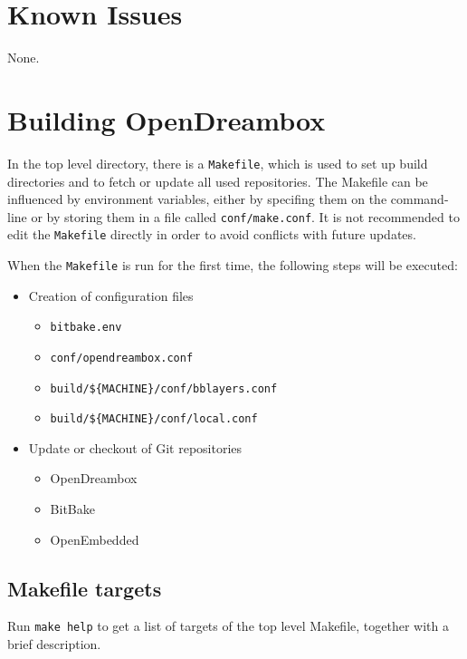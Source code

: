 \documentclass[a4paper]{article}
\newcommand{\shell}[1]{\texttt{\small #1}}
\begin{document}
\section{Known Issues}

  None.

\pagebreak

\section{Building OpenDreambox}

  In the top level directory, there is a \shell{Makefile}, which is used to
  set up build directories and to fetch or update all used repositories.
  The Makefile can be influenced by environment variables, either
  by specifing them on the command-line or by storing them in a file called
  \shell{conf/make.conf}. It is not recommended to edit the \shell{Makefile} directly
  in order to avoid conflicts with future updates.

  When the \shell{Makefile} is run for the first time, the following steps will
  be executed:

  \begin{itemize}
    \item Creation of configuration files
      \begin{itemize}
        \item \shell{bitbake.env}
        \item \shell{conf/opendreambox.conf}
        \item \shell{build/\$\{MACHINE\}/conf/bblayers.conf}
        \item \shell{build/\$\{MACHINE\}/conf/local.conf}
      \end{itemize}
    \item Update or checkout of Git repositories
      \begin{itemize}
        \item OpenDreambox
        \item BitBake
        \item OpenEmbedded
      \end{itemize}
  \end{itemize}

  \subsection{Makefile targets}
    Run \shell{make help} to get a list of targets of the top level Makefile, together with a brief description.
\end{document}

